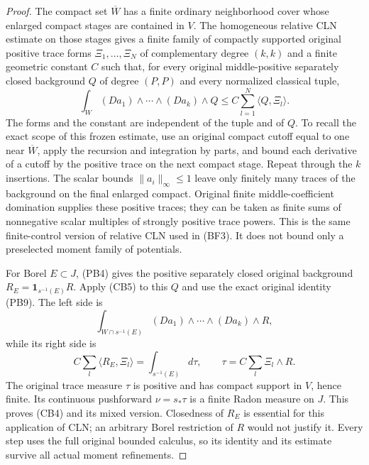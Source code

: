 \documentclass[11pt,a4paper]{article}
\numberwithin{equation}{section}
\theoremstyle{definition}
\theoremstyle{remark}
\begin{document}
\begin{proof}
The compact set $\overline W$ has a finite ordinary neighborhood
cover whose enlarged compact stages are contained in $V$. The
homogeneous relative CLN estimate on those stages gives a finite
family of compactly supported original positive trace forms
$\Xi_1,\ldots,\Xi_N$ of complementary degree $(k,k)$ and a
finite geometric constant $C$ such that, for every original
middle-positive separately closed background $Q$ of degree
$(P,P)$ and every normalized classical tuple,
\[
 \int_W (Da_1)\wedge\cdots\wedge(Da_k)\wedge Q
                  \leq C\sum_{l=1}^N\langle Q,\Xi_l\rangle.
 \tag{CB5}
\]
The forms and the constant are independent of the tuple and of
$Q$. To recall the exact scope of this frozen estimate, use an
original compact cutoff equal to one near $\overline W$, apply
the recursion and integration by parts, and bound each derivative
of a cutoff by the positive trace on the next compact stage.
Repeat through the $k$ insertions. The scalar bounds
$\|a_i\|_\infty\leq1$ leave only finitely many traces of the
background on the final enlarged compact. Original finite
middle-coefficient domination supplies these positive traces;
they can be taken as finite sums of nonnegative scalar multiples
of strongly positive trace powers. This is the same finite-control
version of relative CLN used in (BF3). It does not bound only a
preselected moment family of potentials.

For Borel $E\subset J$, (PB4) gives the positive separately
closed original background
$R_E=\mathbf1_{s^{-1}(E)}R$. Apply (CB5) to this $Q$ and
use the exact original identity (PB9). The left side is
\[
 \int_{W\cap s^{-1}(E)}(Da_1)\wedge\cdots\wedge(Da_k)\wedge R,
\]
while its right side is
\[
 C\sum_l\langle R_E,\Xi_l\rangle
       =\int_{s^{-1}(E)}d\tau,
 \qquad \tau=C\sum_l\Xi_l\wedge R.
 \tag{CB6}
\]
The original trace measure $\tau$ is positive and has compact
support in $V$, hence finite. Its continuous pushforward
$\nu=s_*\tau$ is a finite Radon measure on $J$. This proves
(CB4) and its mixed version. Closedness of $R_E$ is essential
for this application of CLN; an arbitrary Borel restriction of
$R$ would not justify it. Every step uses the full original
bounded calculus, so its identity and its estimate survive all
actual moment refinements.
\end{proof}
\end{document}
